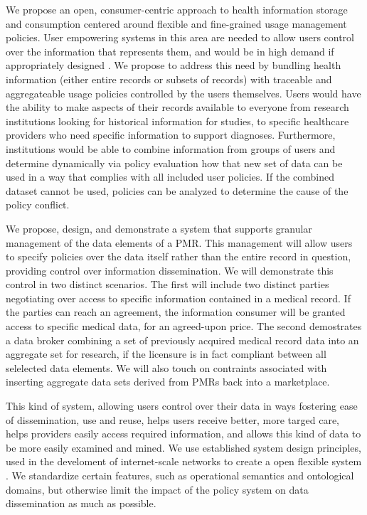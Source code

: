 \documentclass[10pt, conference, compsocconf]{IEEEtran}
\begin{document}
We propose an open, consumer-centric approach to health information storage and consumption centered around flexible and fine-grained usage management policies.  User empowering systems in this area are needed to allow users control over the information that represents them, and would be in high demand if appropriately designed \cite{Emr:PyAmWaCr}.  We propose to address this need by bundling health information (either entire records or subsets of records) with traceable and aggregateable usage policies controlled by the users themselves.  Users would have the ability to make aspects of their records available to everyone from research institutions looking for historical information for studies, to specific healthcare providers who need specific information to support diagnoses.  Furthermore, institutions would be able to combine information from groups of users and determine dynamically via policy evaluation how that new set of data can be used in a way that complies with all included user policies.  If the combined dataset cannot be used, policies can be analyzed to determine the cause of the policy conflict.

We propose, design, and demonstrate a system that supports granular management of the data elements of a PMR.  This management will allow users to specify policies over the data itself rather than the entire record in question, providing control over information dissemination.  We will demonstrate this control in two distinct scenarios.  The first will include two distinct parties negotiating over access to specific information contained in a medical record.  If the parties can reach an agreement, the information consumer will be granted access to specific medical data, for an agreed-upon price.  The second demostrates a data broker combining a set of previously acquired medical record data into an aggregate set for research, if the licensure is in fact compliant between all selelected data elements.  We will also touch on contraints associated with inserting aggregate data sets derived from PMRs back into a marketplace.

This kind of system, allowing users control over their data in ways fostering ease of dissemination, use and reuse, helps users receive better, more targed care, helps providers easily access required information, and allows this kind of data to be more easily examined and mined.  We use established system design principles, used in the develoment of internet-scale networks to create a open flexible system \cite{Al:04,BlCl:01,ClWrSoBr:02}.  We standardize certain features, such as operational semantics and ontological domains, but otherwise limit the impact of the policy system on data dissemination as much as possible.
\end{document}
